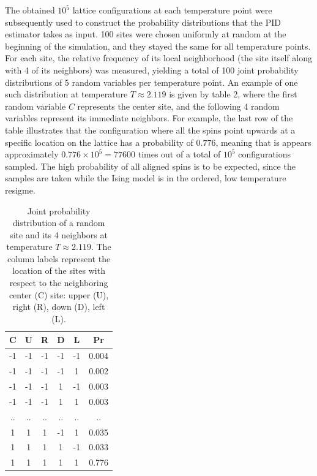 \documentclass[12pt]{article}
\begin{document}
The obtained $10^5$ lattice configurations at each temperature  point were subsequently used to construct the probability distributions that the PID estimator takes as input. 100 sites were chosen uniformly at random at the beginning of the simulation, and they stayed the same for all temperature points. For each site, the relative frequency of its local neighborhood (the site itself along with 4 of its neighbors) was measured, yielding a total of 100 joint probability distributions of 5 random variables per temperature point. An example of one such distribution at temperature $T \approx 2.119$ is given by table 2, where the first random variable $C$ represents the center site, and the following 4 random variables represent its immediate neighbors. For example, the last row of the table illustrates that the configuration where all the spins point upwards at a specific location on the lattice has a probability of $0.776$, meaning that is appears approximately $0.776 \times 10^5 = 77 600$ times out of a total of $10^5$ configurations sampled. The high probability of all aligned spins is to be expected, since the samples are taken while the Ising model is in the ordered, low temperature resigme.

\begin{table}[h!]
\centering
\begin{tabular}{c c c c c c}
	\hline
	C & U & R & D & L & Pr\\ 
	\hline
	-1 & -1 & -1 & -1 & -1 & 0.004 \\
	-1 & -1 & -1 & -1 & 1 & 0.002 \\
	-1 & -1 & -1 & 1 & -1 & 0.003 \\
	-1 & -1 & -1 & 1 & 1 & 0.003 \\
	.. & .. & .. &  .. & .. & .. \\
	1 & 1 & 1 & -1 & 1 & 0.035 \\
 	1 & 1 & 1 & 1 & -1 & 0.033 \\
 	1 & 1 & 1 & 1 & 1 & 0.776 \\
 	\hline
\end{tabular}
\caption{Joint probability distribution of a random site and its 4 neighbors at temperature $T \approx 2.119$. The column labels represent the location of the sites with respect to the neighboring center (C) site: upper (U), right (R), down (D), left (L).}
\label{table:4}
\end{table}
\end{document}
